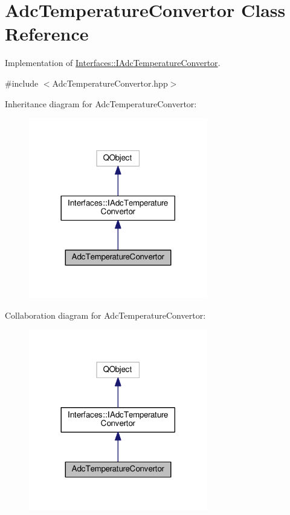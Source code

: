 \hypertarget{class_adc_temperature_convertor}{}\section{Adc\+Temperature\+Convertor Class Reference}
\label{class_adc_temperature_convertor}


Implementation of \hyperlink{class_interfaces_1_1_i_adc_temperature_convertor}{Interfaces\+::\+I\+Adc\+Temperature\+Convertor}.  




{\ttfamily \#include $<$Adc\+Temperature\+Convertor.\+hpp$>$}



Inheritance diagram for Adc\+Temperature\+Convertor\+:\nopagebreak
\begin{figure}[H]
\begin{center}
\leavevmode
\includegraphics[width=221pt]{class_adc_temperature_convertor__inherit__graph}
\end{center}
\end{figure}


Collaboration diagram for Adc\+Temperature\+Convertor\+:\nopagebreak
\begin{figure}[H]
\begin{center}
\leavevmode
\includegraphics[width=221pt]{class_adc_temperature_convertor__coll__graph}
\end{center}
\end{figure}
